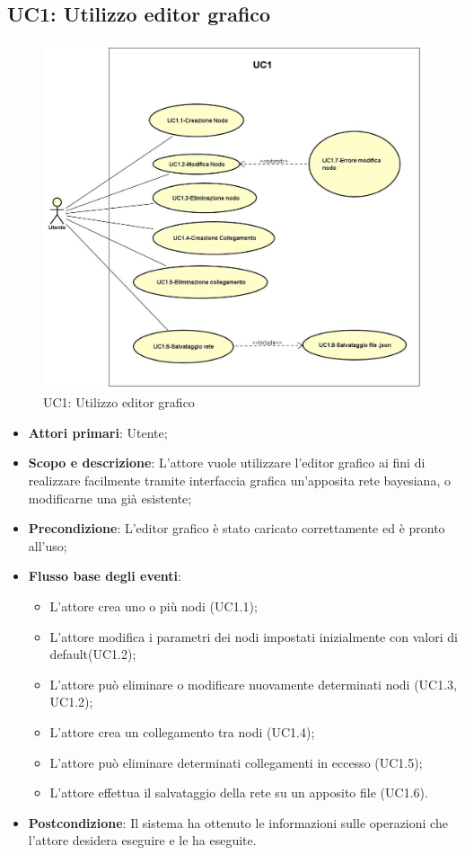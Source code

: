 \subsection{UC1: Utilizzo editor grafico} 
\begin{figure} [H]
	\centering
	\includegraphics[scale=0.45]{Img/UC1} 
	\caption{UC1: Utilizzo editor grafico} \label{} 
\end{figure} 
\begin{itemize} 
	\item{\textbf{Attori primari}: Utente;}
	\item{\textbf{Scopo e descrizione}: L'attore vuole utilizzare l'editor grafico ai fini di realizzare facilmente tramite interfaccia grafica un'apposita rete bayesiana, o modificarne una già esistente;} 
	\item{\textbf{Precondizione}: L'editor grafico è stato caricato correttamente ed è pronto all'uso;} 
	\item{\textbf{Flusso base degli eventi}: 
		\begin{itemize} 
			\item{L'attore crea uno o più nodi (UC1.1);} 
			\item{L'attore modifica i parametri dei nodi impostati inizialmente con valori di default(UC1.2);} 
			\item{L'attore può eliminare o modificare nuovamente determinati nodi (UC1.3, UC1.2)}; 
			\item{L'attore crea un collegamento tra nodi (UC1.4);} 
			\item{L'attore può eliminare determinati collegamenti in eccesso (UC1.5);} 
			\item{L'attore effettua il salvataggio della rete su un apposito file (UC1.6).} 
		\end{itemize} 
	} 
	\item{\textbf{Postcondizione}: Il sistema ha ottenuto le informazioni sulle operazioni che l'attore desidera eseguire e le ha eseguite.} 
\end{itemize} 
